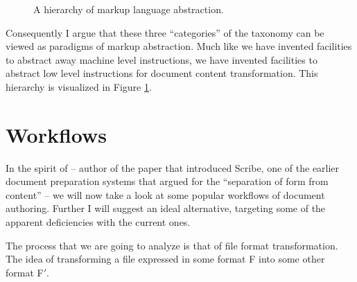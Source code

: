 \documentclass{scrreprt}
\newcommand*{\prim}{\ensuremath{\prime}} %
\begin{document}
\begin{figure}[h]
\centering


\caption{A hierarchy of markup language abstraction.}
\label{fig:markup-types-hierarchy}
\end{figure}



Consequently I argue that these three ``categories'' of the taxonomy can be viewed as paradigms of markup abstraction. Much like we have invented facilities to abstract away machine level instructions, we have invented facilities to abstract low level instructions for document content transformation. This hierarchy is visualized in Figure \ref{fig:markup-types-hierarchy}.  

















\chapter{Workflows}
\label{sec:microframework}
In the spirit of \citet{reid} -- author of the paper that introduced Scribe, one of the earlier document preparation systems that argued for the ``separation of form from content'' -- we will now take a look at some popular workflows of document authoring. Further I will suggest an ideal alternative, targeting some of the apparent deficiencies with the current ones.

The process that we are going to analyze is that of file format transformation. The idea of transforming a file expressed in some format F into some other format F\prim.
\end{document}
